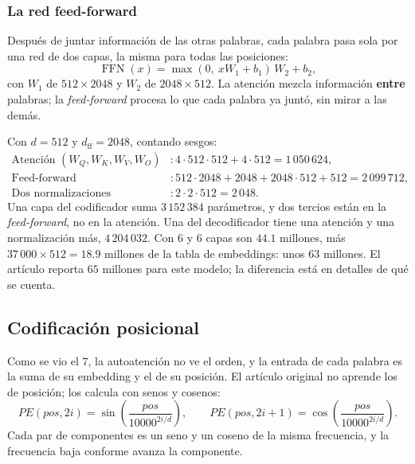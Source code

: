 \documentclass[11pt,letterpaper]{article}
\begin{document}
\subsubsection*{La red feed-forward}

Después de juntar información de las otras palabras, cada palabra
pasa sola por una red de dos capas, la misma para todas las
posiciones:
\[
    \operatorname{FFN}(x) = \max(0,\ x W_1 + b_1)\, W_2 + b_2 ,
\]
con $W_1$ de $512 \times 2048$ y $W_2$ de $2048 \times 512$. La
atención mezcla información \textbf{entre} palabras; la
\textit{feed-forward} procesa lo que cada palabra ya juntó, sin mirar
a las demás.

\begin{ejemplo}
    Con $d = 512$ y $d_{\text{ff}} = 2048$, contando sesgos:
    \begin{align*}
        \text{Atención } (W_Q, W_K, W_V, W_O)
            &: 4 \cdot 512 \cdot 512 + 4 \cdot 512 = 1\,050\,624 , \\
        \text{Feed-forward}
            &: 512 \cdot 2048 + 2048 + 2048 \cdot 512 + 512
             = 2\,099\,712 , \\
        \text{Dos normalizaciones}
            &: 2 \cdot 2 \cdot 512 = 2\,048 .
    \end{align*}
    Una capa del codificador suma $3\,152\,384$ parámetros, y dos
    tercios están en la \textit{feed-forward}, no en la atención. Una
    del decodificador tiene una atención y una normalización más,
    $4\,204\,032$. Con $6$ y $6$ capas son $44.1$ millones, más
    $37\,000 \times 512 = 18.9$ millones de la tabla de embeddings: unos
    $63$ millones. El artículo reporta $65$ millones para este modelo;
    la diferencia está en detalles de qué se cuenta.
\end{ejemplo}


\subsection*{Codificación posicional}

Como se vio el $7$, la autoatención no ve el orden, y la entrada de
cada palabra es la suma de su embedding y el de su posición. El
artículo original no aprende los de posición; los calcula con senos y
cosenos:
\[
    PE(\textit{pos}, 2i) = \sin\!\left(\frac{\textit{pos}}
                                       {10000^{2i/d}}\right) ,
    \qquad
    PE(\textit{pos}, 2i + 1) = \cos\!\left(\frac{\textit{pos}}
                                           {10000^{2i/d}}\right) .
\]
Cada par de componentes es un seno y un coseno de la misma frecuencia,
y la frecuencia baja conforme avanza la componente.
\end{document}
